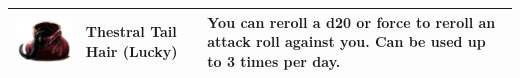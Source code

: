 \begin{tabular}{ m{4cm}m{3cm}m{6cm} }
	\includegraphics[width=4cm]{../Pictures/Gameplay/Items/Wearables/Wand/Cores/Thestral_tail_hair_icon.png} & \textbf{Thestral Tail Hair (Lucky)} & You can reroll a d20 or force to reroll an attack roll against you. Can be used up to 3 times per day. \\ \hline
\end{tabular}

\clearpage
